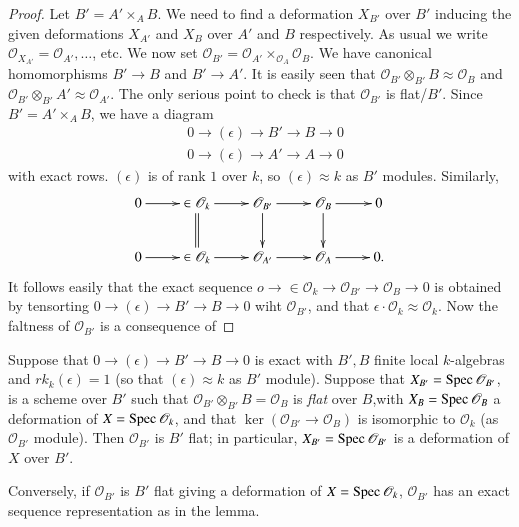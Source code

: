 {\begin{proof}
Let $B'= A'\times_A B$. We need to find a deformation $ X_{B'}$ over
$B'$ inducing the given deformations $X_{A'}$ and $X_B$ over $A'$ and
$B$ respectively. As usual we write
$\mathscr{O}_{X_{A'}}=\mathscr{O}_{A'},\ldots$, etc. We now set
$\mathscr{O}_{B'}=\mathscr{O}_{A'}\times_{\mathscr{O}_A} \mathscr{O}_{B}$. We
have canonical homomorphisms $B'\to B$ and $B'\to A'$. It is easily
seen that $\mathscr{O}_{B'}\otimes_{B'} B\approx \mathscr{O}_B$ and
$\mathscr{O}_{B'}\otimes_{B'}A'\approx \mathscr{O}_{A'}$. The only
serious point to check is that $\mathscr{O}_{B'}$ is flat/$B'$. Since
$B'=A'\times_A B$, we have a diagram 
\begin{align*}
&0\to (\epsilon)\to B'\to B \to 0\\
&0\to (\epsilon)\to A' \to A\to 0
\end{align*}
with exact rows. $(\epsilon)$ is of rank $1$ over $k$, so
$(\epsilon)\approx k$ as $B'$ modules. Similarly, 
\begin{equation*}
\vcenter{
\xymatrix{
0\ar[r]& \in \mathscr{O}_{k}\ar @ {=} [d]\ar
[r]&\mathscr{O}_{B'}\ar[d]\ar[r]&\mathscr{O}_{B}\ar [d]\ar [r]& 0\\ 
0\ar[r]&\in \mathscr{O}_{k}\ar[r]& \mathscr{O}_{A'}\ar[r]&\mathscr{O}_{A}\ar[r]&0.
}}
\end{equation*}\pageoriginale
It follows easily that the exact sequence
$o\to \in \mathscr{O}_{k}\to \mathscr{O}_{B'}\to \mathscr{O}_{B}\to 0$
is obtained by tensorting $0\to (\epsilon)\to B'\to B \to 0$ wiht
$\mathscr{O}_{B'}$, and that
$\epsilon \cdot \mathscr{O}_{k}\approx \mathscr{O}_{k}$. Now the
faltness of $\mathscr{O}_{B'}$ is a consequence of 
\end{proof}

\begin{lemma}\label{part1-lem8.1}%
Suppose that $0\to (\epsilon)\to B' \to B \to 0$ is exact with $B', B$
finite local $k$-algebras and $rk_{k}(\epsilon)=1$ (so that
$(\epsilon)\approx k$ as $B'$ module). Suppose that
$X_{B'}=\operatorname{Spec} \mathscr{O}_{B'}$, is a scheme over $B'$ such that
$\mathscr{O}_{B'}\otimes_{B'} B=\mathscr{O}_{B}$ is {\em flat} over
$B$,with $X_{B}=\operatorname{Spec} \mathscr{O}_B$ a deformation of
$X=\operatorname{Spec} \mathscr{O}_{k}$, and that
$\ker(\mathscr{O}_{B'}\to \mathscr{O}_{B})$ is isomorphic to
$\mathscr{O}_{k}$ (as $\mathscr{O}_{B'}$ module). Then
$\mathscr{O}_{B'}$ is $B'$ flat; in particular,
$X_{B'}=\operatorname{Spec} \mathscr{O}_{B'}$ is a deformation of $X$ over $B'$. 

Conversely, if $\mathscr{O}_{B'}$ is $B'$ flat giving a deformation of
$X=\operatorname{Spec} \mathscr{O}_{k}$, $\mathscr{O}_{B'}$ has an exact sequence
representation as in the lemma. 
\end{lemma}

}
